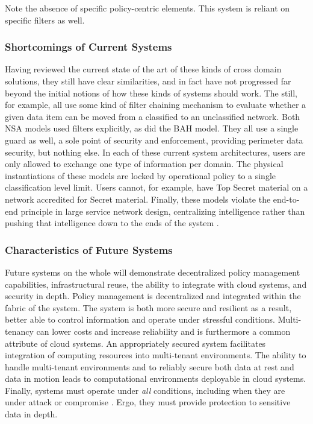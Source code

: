 \documentclass[12pt,letterpaper]{article}
\begin{document}
Note the absence of specific policy-centric elements.  This system is reliant on specific filters as well.

\subsubsection{Shortcomings of Current Systems}
Having reviewed the current state of the art of these kinds of cross domain solutions,  they still have clear similarities, and in fact have not progressed far beyond the initial notions of how these kinds of systems should work.  The still, for example, all use some kind of filter chaining mechanism to evaluate whether a given data item can be moved from a classified to an unclassified network.  Both NSA models used filters explicitly, as did the BAH model.  They all use a single guard as well, a sole point of security and enforcement, providing perimeter data security, but nothing else.  In each of these current system architectures, users are only allowed to exchange one type of information per domain.  The physical instantiations of these models are locked by operational policy to a single classification level limit.  Users cannot, for example, have Top Secret material on a network accredited for Secret material.  Finally, these models violate the end-to-end principle in large service network design, centralizing intelligence rather than pushing that intelligence down to the ends of the system \cite{Blumenthal:2001:RDI:383034.383037}.

\subsubsection{Characteristics of Future Systems}
Future systems on the whole will demonstrate decentralized policy management capabilities, infrastructural reuse, the ability to integrate with cloud systems, and security in depth.  Policy management is decentralized and integrated within the fabric of the system.  The system is both more secure and resilient as a result, better able to control information and operate under stressful conditions.  Multi-tenancy can lower costs and increase reliability and is furthermore a common attribute of cloud systems.  An appropriately secured system facilitates integration of computing resources into multi-tenant environments.  The ability to handle multi-tenant environments and to reliably secure both data at rest and data in motion leads to computational environments deployable in cloud systems.  Finally, systems must operate under \textit{all} conditions, including when they are under attack or compromise \cite{proposal:ron-ross}.  Ergo, they must provide protection to sensitive data in depth.
\end{document}
